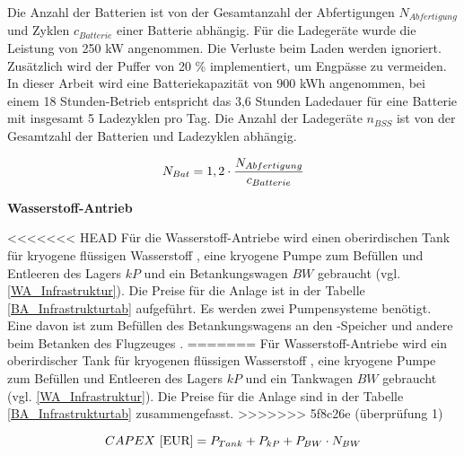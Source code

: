 Die Anzahl der Batterien ist von der Gesamtanzahl der Abfertigungen $N_{Abfertigung}$ und Zyklen $c_{Batterie}$ einer Batterie abhängig. 
Für die Ladegeräte wurde die Leistung von 250 kW angenommen. 
Die Verluste beim Laden werden ignoriert. 
Zusätzlich wird der Puffer von 20 \% implementiert, um Engpässe zu vermeiden. 
In dieser Arbeit wird eine Batteriekapazität von 900 kWh angenommen, bei einem 18 Stunden-Betrieb 
entspricht das 3,6 Stunden Ladedauer für eine Batterie mit insgesamt 5 Ladezyklen pro Tag. 
Die Anzahl der Ladegeräte $n_{BSS}$ ist von der Gesamtzahl der Batterien und Ladezyklen abhängig.

\begin{equation}
  {N_{Bat}} = {1,2} \cdot \frac{N_{Abfertigung}}{c_{Batterie}}\\
  \label{BatAnzahl}
  \end{equation}

\textbf{Wasserstoff-Antrieb}


<<<<<<< HEAD
Für die Wasserstoff-Antriebe wird einen oberirdischen Tank für kryogene flüssigen Wasserstoff , eine kryogene Pumpe 
zum Befüllen und Entleeren des Lagers ${kP}$ und ein Betankungswagen ${BW}$ gebraucht (vgl. \eqref{WA_Infrastruktur}). 
Die Preise für die Anlage ist in der Tabelle \ref{BA_Infrastrukturtab} aufgeführt. Es werden zwei Pumpensysteme benötigt.
Eine davon ist zum Befüllen des Betankungswagens an den -Speicher und andere beim Betanken des Flugzeuges \cite{hoelzen2022h2}.
=======
Für Wasserstoff-Antriebe wird ein oberirdischer Tank für kryogenen flüssigen Wasserstoff , 
eine kryogene Pumpe zum Befüllen und Entleeren des Lagers ${kP}$ und ein Tankwagen ${BW}$ gebraucht (vgl. \eqref{WA_Infrastruktur}). 
Die Preise für die Anlage sind in der Tabelle \ref{BA_Infrastrukturtab} zusammengefasst.
>>>>>>> 5f8c26e (überprüfung 1)

\begin{equation}
   {CAPEX ~[\text{EUR}]} = {P_{Tank}} + P_{kP} + P_{BW} \cdot N_{BW}  \\
   \label{WA_Infrastruktur}
\end{equation}

